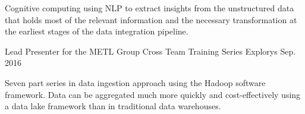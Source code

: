 \begin{cventries}
{\begin{cvcompactparagraph}
        Cognitive computing using NLP to extract insights from the unstructured data that holds most of the relevant information and the necessary transformation at the earliest stages of the data integration pipeline.
      \end{cvcompactparagraph}
    }
  \cventry
    {Lead Presenter for the METL Group} %
    {Cross Team Training Series} %
    {Explorys} %
    {Sep. 2016} %
    {
      \begin{cvcompactparagraph}
        Seven part series in data ingestion approach using the Hadoop software framework.  Data can be aggregated much more quickly and cost-effectively using a data lake framework than in traditional data warehouses.
      \end{cvcompactparagraph}
    }
\end{cventries}
